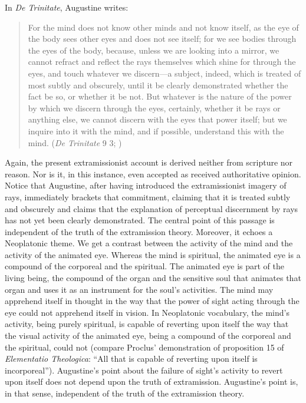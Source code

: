 \documentclass[12pt]{article}
\begin{document}
In \emph{De Trinitate}, Augustine writes:
\begin{quote}
	For the mind does not know other minds and not know itself, as the eye of the body sees other eyes and does not see itself; for we see bodies through the eyes of the body, because, unless we are looking into a mirror, we cannot refract and reflect the rays themselves which shine for through the eyes, and touch whatever we discern---a subject, indeed, which is treated of most subtly and obscurely, until it be clearly demonstrated whether the fact be so, or whether it be not. But whatever is the nature of the power by which we discern through the eyes, certainly, whether it be rays or anything else, we cannot discern with the eyes that power itself; but we inquire into it with the mind, and if possible, understand this with the mind. (\emph{De Trinitate} 9 3; \citealt[226]{Haddan:1873aa})
\end{quote}
Again, the present extramissionist account is derived neither from scripture nor reason. Nor is it, in this instance, even accepted as received authoritative opinion. Notice that Augustine, after having introduced the extramissionist imagery of rays, immediately brackets that commitment, claiming that it is treated subtly and obscurely and claims that the explanation of perceptual discernment by rays has not yet been clearly demonstrated. The central point of this passage is independent of the truth of the extramission theory. Moreover, it echoes a Neoplatonic theme. We get a contrast between the activity of the mind and the activity of the animated eye. Whereas the mind is spiritual, the animated eye is a compound of the corporeal and the spiritual. The animated eye is part of the living being, the compound of the organ and the sensitive soul that animates that organ and uses it as an instrument for the soul's activities. The mind may apprehend itself in thought in the way that the power of sight acting through the eye could not apprehend itself in vision.  In Neoplatonic vocabulary, the mind's activity, being purely spiritual, is capable of reverting upon itself the way that the visual activity of the animated eye, being a compound of the corporeal and the spiritual, could not (compare Proclus' demonstration of proposition 15 of \emph{Elementatio Theologica}: “All that is capable of reverting upon itself is incorporeal”). Augustine's point about the failure of sight's activity to revert upon itself does not depend upon the truth of extramission. Augustine's point is, in that sense, independent of the truth of the extramission theory.
\end{document}
